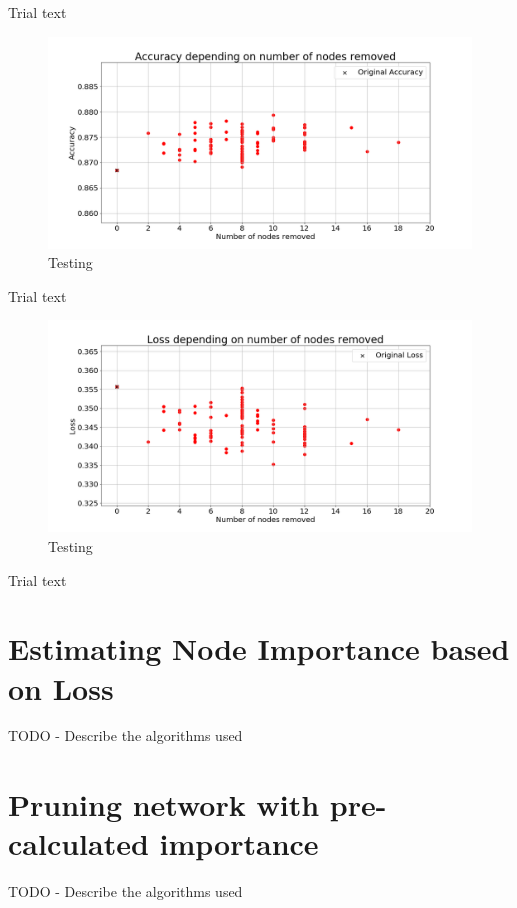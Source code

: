 \documentclass[UKenglish]{ifimaster}
\begin{document}
            Trial text

            \begin{figure}[h!]\centering
                \includegraphics[width=\textwidth]{Accuracy_vs_nodes_removed_fmnist.png}
                \caption[Short title]{Testing}
                \label{fig:acc_rn_imp_fmnist}
            \end{figure}

            Trial text

            \begin{figure}[h!]\centering
                \includegraphics[width=\textwidth]{Loss_vs_nodes_removed_fmnist.png}
                \caption[Short title]{Testing}
                \label{fig:loss_rn_imp_fmnist}
            \end{figure}

            Trial text

    \section{Estimating Node Importance based on Loss}
        TODO - Describe the algorithms used

    \section{Pruning network with pre-calculated importance}
        TODO - Describe the algorithms used
\end{document}

